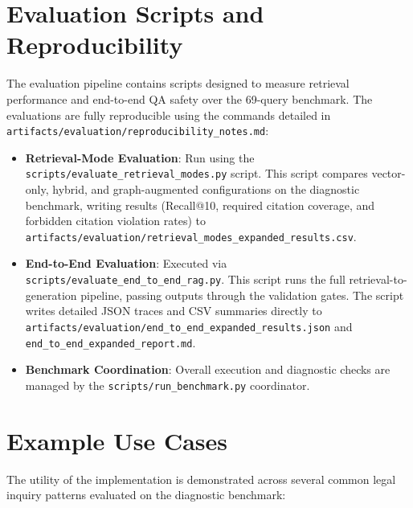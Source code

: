 \section{Evaluation Scripts and Reproducibility}
The evaluation pipeline contains scripts designed to measure retrieval performance and end-to-end QA safety over the 69-query benchmark. The evaluations are fully reproducible using the commands detailed in \texttt{artifacts/\allowbreak{}evaluation/\allowbreak{}reproducibility\_notes.md}:

\begin{itemize}
  \item \textbf{Retrieval-Mode Evaluation}: Run using the \texttt{scripts/\allowbreak{}evaluate\_retrieval\_modes.py} script. This script compares vector-only, hybrid, and graph-augmented configurations on the diagnostic benchmark, writing results (Recall@10, required citation coverage, and forbidden citation violation rates) to \texttt{artifacts/\allowbreak{}evaluation/\allowbreak{}retrieval\_modes\_expanded\_results.csv}.
  \item \textbf{End-to-End Evaluation}: Executed via \texttt{scripts/\allowbreak{}evaluate\_end\_to\_end\_rag.py}. This script runs the full retrieval-to-generation pipeline, passing outputs through the validation gates. The script writes detailed JSON traces and CSV summaries directly to \texttt{artifacts/\allowbreak{}evaluation/\allowbreak{}end\_to\_end\_expanded\_results.json} and \texttt{end\_to\_end\_expanded\_report.md}.
  \item \textbf{Benchmark Coordination}: Overall execution and diagnostic checks are managed by the \texttt{scripts/run\_benchmark.py} coordinator.
\end{itemize}

\section{Example Use Cases}
The utility of the implementation is demonstrated across several common legal inquiry patterns evaluated on the diagnostic benchmark:

